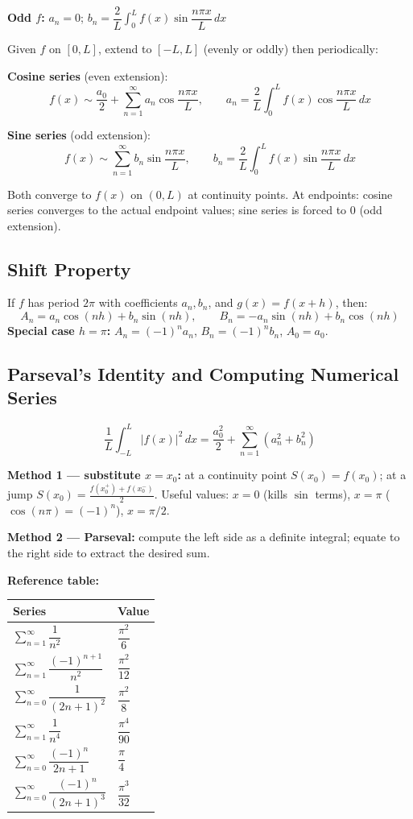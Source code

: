 \documentclass[12pt, a4paper]{article}
\theoremstyle{definition}
\theoremstyle{remark}
\begin{document}
\textbf{Odd $f$:} $a_n = 0$;\quad
$b_n = \dfrac{2}{L}\displaystyle\int_0^L f(x)\sin\dfrac{n\pi x}{L}\,dx$

\medskip
Given $f$ on $[0,L]$, extend to $[-L,L]$ (evenly or oddly) then periodically:

\textbf{Cosine series} (even extension):
\[
  f(x) \sim \frac{a_0}{2} + \sum_{n=1}^\infty a_n \cos\frac{n\pi x}{L},
  \qquad
  a_n = \frac{2}{L}\int_0^L f(x)\cos\frac{n\pi x}{L}\,dx
\]

\textbf{Sine series} (odd extension):
\[
  f(x) \sim \sum_{n=1}^\infty b_n \sin\frac{n\pi x}{L},
  \qquad
  b_n = \frac{2}{L}\int_0^L f(x)\sin\frac{n\pi x}{L}\,dx
\]

Both converge to $f(x)$ on $(0,L)$ at continuity points. At endpoints: cosine series converges to the actual endpoint values; sine series is forced to 0 (odd extension).

\subsection{Shift Property}

If $f$ has period $2\pi$ with coefficients $a_n,b_n$, and $g(x) = f(x+h)$, then:
\[
  A_n = a_n\cos(nh) + b_n\sin(nh),
  \qquad
  B_n = -a_n\sin(nh) + b_n\cos(nh)
\]
\textbf{Special case $h = \pi$:} $A_n = (-1)^n a_n$, $B_n = (-1)^n b_n$, $A_0 = a_0$.

\subsection{Parseval's Identity and Computing Numerical Series}

\[
  \frac{1}{L}\int_{-L}^{L}|f(x)|^2\,dx
  = \frac{a_0^2}{2} + \sum_{n=1}^\infty \left(a_n^2 + b_n^2\right)
\]

\textbf{Method 1 --- substitute $x = x_0$:} at a continuity point $S(x_0)=f(x_0)$; at a jump $S(x_0)=\frac{f(x_0^+)+f(x_0^-)}{2}$.
Useful values: $x=0$ (kills $\sin$ terms), $x=\pi$ ($\cos(n\pi)=(-1)^n$), $x=\pi/2$.

\textbf{Method 2 --- Parseval:} compute the left side as a definite integral; equate to the right side to extract the desired sum.

\textbf{Reference table:}
\begin{center}
\begin{tabular}{ll}
\toprule
Series & Value \\
\midrule
$\displaystyle\sum_{n=1}^\infty \dfrac{1}{n^2}$ & $\dfrac{\pi^2}{6}$ \\[10pt]
$\displaystyle\sum_{n=1}^\infty \dfrac{(-1)^{n+1}}{n^2}$ & $\dfrac{\pi^2}{12}$ \\[10pt]
$\displaystyle\sum_{n=0}^\infty \dfrac{1}{(2n+1)^2}$ & $\dfrac{\pi^2}{8}$ \\[10pt]
$\displaystyle\sum_{n=1}^\infty \dfrac{1}{n^4}$ & $\dfrac{\pi^4}{90}$ \\[10pt]
$\displaystyle\sum_{n=0}^\infty \dfrac{(-1)^n}{2n+1}$ & $\dfrac{\pi}{4}$ \\[10pt]
$\displaystyle\sum_{n=0}^\infty \dfrac{(-1)^n}{(2n+1)^3}$ & $\dfrac{\pi^3}{32}$ \\
\bottomrule
\end{tabular}
\end{center}
\end{document}
